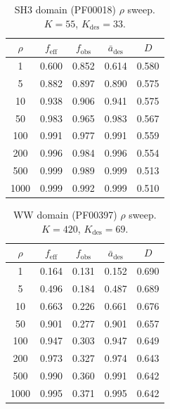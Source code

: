\begin{table}[ht]
  \centering
  \caption{SH3 domain (PF00018) $\rho$ sweep. $K=55$, $K_{\mathrm{des}}=33$.}
  \label{tab:sh3-rho}
  \small
  \begin{tabular}{ccccc}
    \toprule
    $\rho$ & $f_{\mathrm{eff}}$ & $f_{\mathrm{obs}}$ & $\bar{a}_{\mathrm{des}}$ & $D$ \\
    \midrule
    1    & 0.600 & 0.852 & 0.614 & 0.580 \\
    5    & 0.882 & 0.897 & 0.890 & 0.575 \\
    10   & 0.938 & 0.906 & 0.941 & 0.575 \\
    50   & 0.983 & 0.965 & 0.983 & 0.567 \\
    100  & 0.991 & 0.977 & 0.991 & 0.559 \\
    200  & 0.996 & 0.984 & 0.996 & 0.554 \\
    500  & 0.999 & 0.989 & 0.999 & 0.513 \\
    1000 & 0.999 & 0.992 & 0.999 & 0.510 \\
    \bottomrule
  \end{tabular}
\end{table}

\begin{table}[ht]
  \centering
  \caption{WW domain (PF00397) $\rho$ sweep. $K=420$, $K_{\mathrm{des}}=69$.}
  \label{tab:ww-rho}
  \small
  \begin{tabular}{ccccc}
    \toprule
    $\rho$ & $f_{\mathrm{eff}}$ & $f_{\mathrm{obs}}$ & $\bar{a}_{\mathrm{des}}$ & $D$ \\
    \midrule
    1    & 0.164 & 0.131 & 0.152 & 0.690 \\
    5    & 0.496 & 0.184 & 0.487 & 0.689 \\
    10   & 0.663 & 0.226 & 0.661 & 0.676 \\
    50   & 0.901 & 0.277 & 0.901 & 0.657 \\
    100  & 0.947 & 0.303 & 0.947 & 0.649 \\
    200  & 0.973 & 0.327 & 0.974 & 0.643 \\
    500  & 0.990 & 0.360 & 0.991 & 0.642 \\
    1000 & 0.995 & 0.371 & 0.995 & 0.642 \\
    \bottomrule
  \end{tabular}
\end{table}

